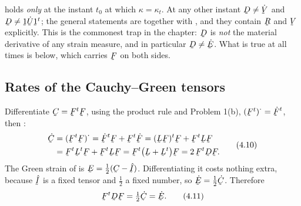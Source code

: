 \begin{remark}
\label{rem:trapdot}
 holds \emph{only} at the instant $t_{0}$ at which
$\kappa=\kappa_{t}$. At any other instant $\bD\neq\dot\bV$ and
$\bD\neq\shift\dot\bU\shift^{t}$; the general statements are 
together with , and they contain $\bR$ and $\bV$ explicitly. This
is the commonest trap in the chapter: $\bD$ is \emph{not} the material
derivative of any strain measure, and in particular
$\bD\neq\dot\bE$. What is true at all times is  below, which
carries $\bF$ on both sides.
\end{remark}

\subsection*{Rates of the Cauchy--Green tensors}

Differentiate $\bC=\bF^{t}\bF$, using the product rule and Problem 1(b),
$(\bF^{t})^{\textstyle\cdot}=\dot\bF^{t}$, then :
\begin{equation}
\begin{aligned}
   \dot\bC&=(\bF^{t}\bF)^{\textstyle\cdot}
   =\dot\bF^{t}\bF+\bF^{t}\dot\bF
   =(\bL\bF)^{t}\bF+\bF^{t}\bL\bF\\
   &=\bF^{t}\bL^{t}\bF+\bF^{t}\bL\bF
   =\bF^{t}\big(\bL+\bL^{t}\big)\bF=2\,\bF^{t}\bD\bF .
\end{aligned}
   \tag{4.10}\label{eq:4.10}
\end{equation}
The Green strain of  is $\bE=\tfrac12(\bC-\hI)$. Differentiating
it costs nothing extra, because $\hI$ is a fixed tensor and $\tfrac12$ a
fixed number, so $\dot\bE=\tfrac12\dot\bC$. Therefore
\begin{equation}
   \bF^{t}\bD\bF=\tfrac12\dot\bC=\dot\bE .
   \tag{4.11}\label{eq:4.11}
\end{equation}

